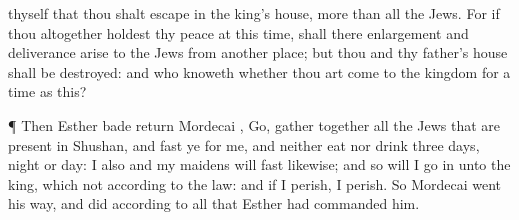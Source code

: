 {thyself that thou shalt
escape in the
king’s
house, more than all the
Jews.
For if thou
altogether holdest thy
peace at this
time,
{} shall there
enlargement and
deliverance
arise to the
Jews from
another
place; but thou and thy
father’s
house shall be
destroyed: and who
knoweth whether thou art
come to the
kingdom for
{} a
time as this?
\par }{\PP {}¶ Then
Esther
bade
{}
return
Mordecai
{},
Go, gather
together all the
Jews that are
present in
Shushan, and
fast ye for me, and neither
eat nor
drink
three
days,
night or
day: I also and my
maidens will
fast likewise; and
so will I
go in unto the
king, which
{} not according to the
law: and if I
perish, I
perish.
So
Mordecai went his
way, and
did according to all that
Esther had
commanded him.

}
